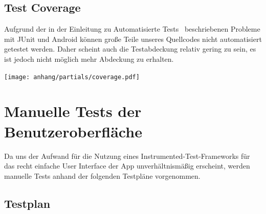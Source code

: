 









\subsection{Test Coverage}

Aufgrund der in der Einleitung zu \glqq Automatisierte Tests\grqq~ beschriebenen Probleme mit JUnit und Android können große Teile unseres Quellcodes nicht automatisiert getestet werden. Daher scheint auch die Testabdeckung relativ gering zu sein, es ist jedoch nicht möglich mehr Abdeckung zu erhalten.

\hspace{-1cm}
\texttt{[image: anhang/partials/coverage.pdf]}

\clearpage

\section{Manuelle Tests der Benutzeroberfläche}

Da uns der Aufwand für die Nutzung eines Instrumented-Test-Frameworks
für das recht einfache User Interface der App unverhältnismäßig
erscheint, werden manuelle Tests anhand der folgenden Testpläne
vorgenommen.

\subsection{Testplan}


